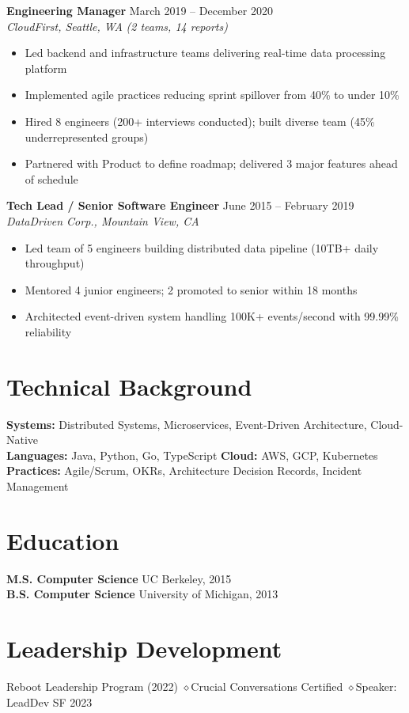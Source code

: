 \documentclass[11pt,a4paper]{article}
\begin{document}
\noindent\textbf{Engineering Manager} \hfill March 2019 -- December 2020\\
\textit{CloudFirst, Seattle, WA} \quad\textit{(2 teams, 14 reports)}
\begin{itemize}[leftmargin=1.5em,nosep]
\item Led backend and infrastructure teams delivering real-time data processing platform
\item Implemented agile practices reducing sprint spillover from 40\% to under 10\%
\item Hired 8 engineers (200+ interviews conducted); built diverse team (45\% underrepresented groups)
\item Partnered with Product to define roadmap; delivered 3 major features ahead of schedule
\end{itemize}
\vspace{0.5em}

\noindent\textbf{Tech Lead / Senior Software Engineer} \hfill June 2015 -- February 2019\\
\textit{DataDriven Corp., Mountain View, CA}
\begin{itemize}[leftmargin=1.5em,nosep]
\item Led team of 5 engineers building distributed data pipeline (10TB+ daily throughput)
\item Mentored 4 junior engineers; 2 promoted to senior within 18 months
\item Architected event-driven system handling 100K+ events/second with 99.99\% reliability
\end{itemize}

\section{Technical Background}
\noindent\textbf{Systems:} Distributed Systems, Microservices, Event-Driven Architecture, Cloud-Native\\
\textbf{Languages:} Java, Python, Go, TypeScript \quad\textbf{Cloud:} AWS, GCP, Kubernetes\\
\textbf{Practices:} Agile/Scrum, OKRs, Architecture Decision Records, Incident Management

\section{Education}
\noindent\textbf{M.S. Computer Science} \hfill UC Berkeley, 2015\\
\textbf{B.S. Computer Science} \hfill University of Michigan, 2013

\section{Leadership Development}
\noindent Reboot Leadership Program (2022) \quad$\diamond$\quad Crucial Conversations Certified \quad$\diamond$\quad Speaker: LeadDev SF 2023
\end{document}
